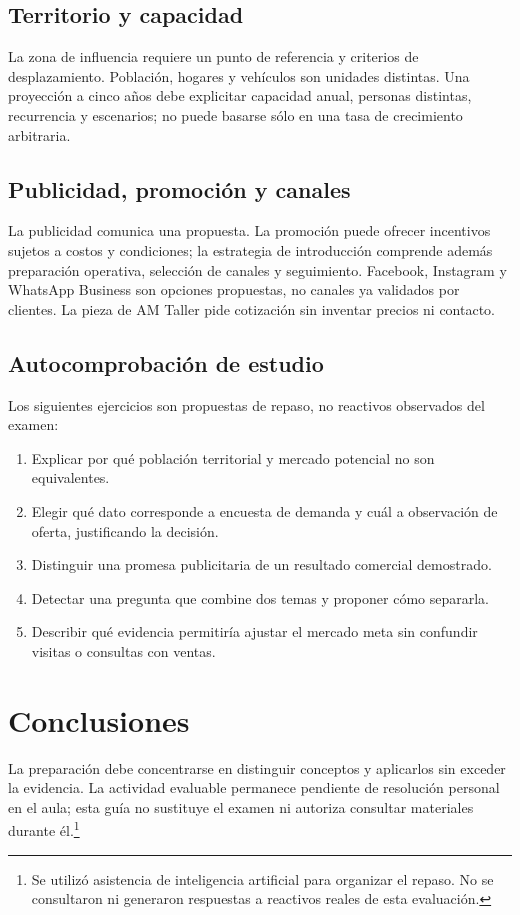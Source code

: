 {\subsection{Territorio y capacidad}
La zona de influencia requiere un punto de referencia y criterios de desplazamiento. Población, hogares y vehículos son unidades distintas. Una proyección a cinco años debe explicitar capacidad anual, personas distintas, recurrencia y escenarios; no puede basarse sólo en una tasa de crecimiento arbitraria.
\subsection{Publicidad, promoción y canales}
La publicidad comunica una propuesta. La promoción puede ofrecer incentivos sujetos a costos y condiciones; la estrategia de introducción comprende además preparación operativa, selección de canales y seguimiento. Facebook, Instagram y WhatsApp Business son opciones propuestas, no canales ya validados por clientes. La pieza de AM Taller pide cotización sin inventar precios ni contacto.
\subsection{Autocomprobación de estudio}
Los siguientes ejercicios son propuestas de repaso, no reactivos observados del examen:
\begin{enumerate}
\item Explicar por qué población territorial y mercado potencial no son equivalentes.
\item Elegir qué dato corresponde a encuesta de demanda y cuál a observación de oferta, justificando la decisión.
\item Distinguir una promesa publicitaria de un resultado comercial demostrado.
\item Detectar una pregunta que combine dos temas y proponer cómo separarla.
\item Describir qué evidencia permitiría ajustar el mercado meta sin confundir visitas o consultas con ventas.
\end{enumerate}
\section{Conclusiones}
La preparación debe concentrarse en distinguir conceptos y aplicarlos sin exceder la evidencia. La actividad evaluable permanece pendiente de resolución personal en el aula; esta guía no sustituye el examen ni autoriza consultar materiales durante él.\footnote{Se utilizó asistencia de inteligencia artificial para organizar el repaso. No se consultaron ni generaron respuestas a reactivos reales de esta evaluación.}
}
